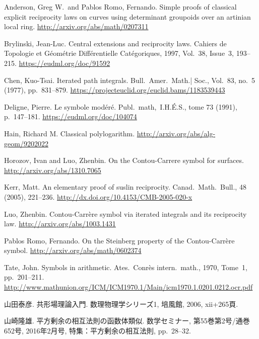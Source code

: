 \documentclass[12pt,twoside]{jarticle}
\theoremstyle{definition} %
\theoremstyle{definition} %
\theoremstyle{definition} %
\numberwithin{theorem}{section}
\numberwithin{equation}{section}
\numberwithin{figure}{section}
\numberwithin{table}{section}
\begin{document}
\begin{thebibliography}{99}

Anderson, Greg W.\ and Pablos Romo, Fernando.
Simple proofs of classical explicit reciprocity laws on curves 
using determinant groupoids over an artinian local ring.
\href{http://arxiv.org/abs/math/0207311}
{http://arxiv.org/abs/math/0207311}

Brylinski, Jean-Luc.
Central extensions and reciprocity laws.
Cahiers de Topologie et G\'eom\'etrie Diff\'erentielle Cat\'egoriques, 
1997, Vol.~38, Issue~3, 193--215.
\href{https://eudml.org/doc/91592}
{https://eudml.org/doc/91592}

Chen, Kuo-Tsai.
Iterated path integrals.
Bull.\ Amer.\ Math.| Soc.,
Vol.~83, no.~5 (1977), pp.~831--879.
\href{https://projecteuclid.org/euclid.bams/1183539443}
{https://projecteuclid.org/euclid.bams/1183539443}

Deligne, Pierre.
Le symbole mod\'er\'e.
Publ.\ math,\ I.H.\'E.S., tome 73 (1991), p.~147--181.
\href{https://eudml.org/doc/104074}
{https://eudml.org/doc/104074}

Hain, Richard M.
Classical polylogarithm.
\href{http://arxiv.org/abs/alg-geom/9202022}
{http://arxiv.org/abs/alg-geom/9202022}

Horozov, Ivan and Luo, Zhenbin.
On the Contou-Carrere symbol for surfaces.
\href{http://arxiv.org/abs/1310.7065}
{http://arxiv.org/abs/1310.7065}

Kerr, Matt.
An elementary proof of suslin reciprocity.
Canad.\ Math.\ Bull., 48 (2005), 221--236.
\href{ http://dx.doi.org/10.4153/CMB-2005-020-x}
{http://dx.doi.org/10.4153/CMB-2005-020-x}

Luo, Zhenbin.
Contou-Carr\`ere symbol via iterated integrals and its reciprocity law.
\href{http://arxiv.org/abs/1003.1431}
{http://arxiv.org/abs/1003.1431}

Pablos Romo, Fernando.
On the Steinberg property of the Contou-Carr\`ere symbol.
\href{http://arxiv.org/abs/math/0602374}
{http://arxiv.org/abs/math/0602374}

Tate, John.
Symbols in arithmetic.
Ates.\ Conr\`es intern.\ math., 1970, Tome~1, pp.~201--211.
\href{http://www.mathunion.org/ICM/ICM1970.1/Main/icm1970.1.0201.0212.ocr.pdf}
{http://www.mathunion.org/ICM/ICM1970.1/Main/icm1970.1.0201.0212.ocr.pdf}

山田泰彦.
共形場理論入門. 
数理物理学シリーズ1, 培風館, 2006, xii+265頁.

山崎隆雄. 
平方剰余の相互法則の函数体類似. 
数学セミナー, 第55巻第2号/通巻652号, 
2016年2月号, 
特集：平方剰余の相互法則,
pp.~28--32. 

\end{thebibliography}



\end{document}

